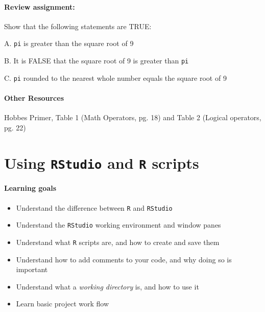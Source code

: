 \documentclass[
]{book}
\providecommand{\tightlist}{%
  \setlength{\itemsep}{0pt}\setlength{\parskip}{0pt}}
\begin{document}
\hypertarget{review-assignment}{%
\subsubsection*{Review assignment:}\label{review-assignment}}

Show that the following statements are TRUE:

A. \texttt{pi} is greater than the square root of 9

B. It is FALSE that the square root of 9 is greater than \texttt{pi}

C. \texttt{pi} rounded to the nearest whole number equals the square root of 9

\hypertarget{other-resources}{%
\subsubsection*{Other Resources}\label{other-resources}}

Hobbes Primer, Table 1 (Math Operators, pg. 18) and Table 2 (Logical operators, pg. 22)

\hypertarget{using-rstudio-and-r-scripts}{%
\chapter{\texorpdfstring{Using \texttt{RStudio} and \texttt{R} scripts}{Using RStudio and R scripts}}\label{using-rstudio-and-r-scripts}}

\hypertarget{learning-goals-1}{%
\subsubsection*{Learning goals}\label{learning-goals-1}}

\begin{itemize}
\tightlist
\item
  Understand the difference between \texttt{R} and \texttt{RStudio}
\item
  Understand the \texttt{RStudio} working environment and window panes\\
\item
  Understand what \texttt{R} scripts are, and how to create and save them
\item
  Understand how to add comments to your code, and why doing so is important
\item
  Understand what a \emph{working directory} is, and how to use it
\item
  Learn basic project work flow
\end{itemize}
\end{document}
